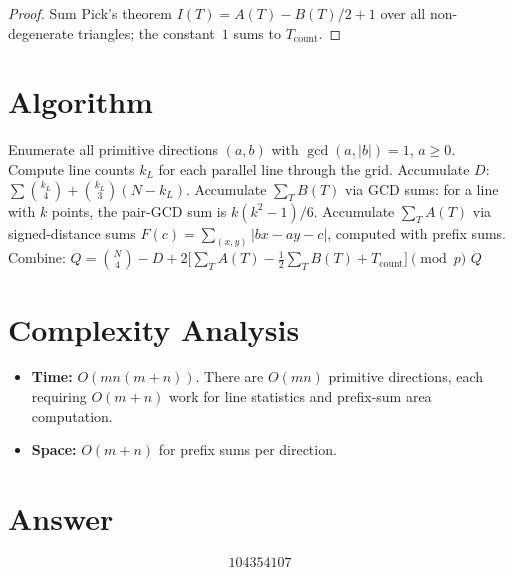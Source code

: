 \documentclass[12pt,a4paper]{article}
\begin{document}
\begin{proof}
Sum Pick's theorem $I(T) = A(T) - B(T)/2 + 1$ over all non-degenerate triangles; the constant~$1$ sums to $T_{\mathrm{count}}$.
\end{proof}

\section{Algorithm}

\begin{algorithm}[H]
\caption{Compute $Q(m, n) \bmod p$}
\begin{algorithmic}[1]
\State Enumerate all primitive directions $(a, b)$ with $\gcd(a, |b|) = 1$, $a \ge 0$.
    \State Compute line counts $k_L$ for each parallel line through the grid.
    \State Accumulate $D$: $\sum \binom{k_L}{4} + \binom{k_L}{3}(N - k_L)$.
    \State Accumulate $\sum_T B(T)$ via GCD sums: for a line with $k$ points, the pair-GCD sum is $k(k^2-1)/6$.
    \State Accumulate $\sum_T A(T)$ via signed-distance sums $F(c) = \sum_{(x,y)} |bx - ay - c|$, computed with prefix sums.
\EndFor
\State Combine: $Q = \binom{N}{4} - D + 2\bigl[\sum_T A(T) - \tfrac{1}{2}\sum_T B(T) + T_{\mathrm{count}}\bigr] \pmod{p}$
\State \Return $Q$
\end{algorithmic}
\end{algorithm}

\section{Complexity Analysis}

\begin{itemize}
    \item \textbf{Time:} $O(mn(m+n))$. There are $O(mn)$ primitive directions, each requiring $O(m+n)$ work for line statistics and prefix-sum area computation.
    \item \textbf{Space:} $O(m+n)$ for prefix sums per direction.
\end{itemize}

\section{Answer}

\[
\boxed{104354107}
\]
\end{document}
